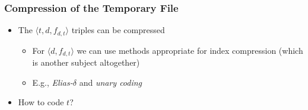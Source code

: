 \documentclass[svgnames]{beamer}
\begin{document}

\begin{frame}
    \frametitle{Compression of the Temporary File}

    \begin{block}{}
        \begin{itemize}
        \item<+-> The $\langle t,d,f_{d,t} \rangle$ triples can be compressed 
            \begin{itemize}
            \item For $\langle d,f_{d,t} \rangle$ we can use methods
                appropriate for index compression (which is another subject
                altogether)
            \item E.g., \emph{Elias-$\delta$} and \emph{unary coding}
            \end{itemize}
        \item<+-> How to code $t$?
        \end{itemize}
    \end{block}

\end{frame}

\end{document}
